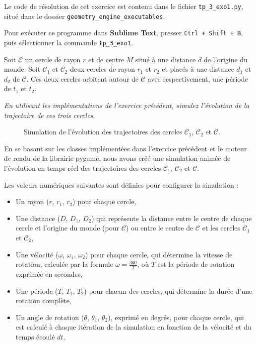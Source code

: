 \documentclass[a4paper,12pt]{article}
\begin{document}
Le code de résolution de cet exercice est contenu dans le fichier \texttt{tp\_3\_exo1.py}, situé dans le dossier \texttt{geometry\_engine\_executables}.

Pour exécuter ce programme dans \textbf{Sublime Text}, presser \texttt{Ctrl + Shift + B}, puis sélectionner la commande \texttt{tp\_3\_exo1}.

\newpage

\setlength{\parskip}{0.5em}
\setlength{\parindent}{0em}

Soit $\mathcal{C}$ un cercle de rayon $r$ et de centre $M$ situé à une distance $d$ de l'origine du monde. Soit $\mathcal{C}_1$ et $\mathcal{C}_2$ deux cercles de rayon $r_1$ et $r_2$ et placés à une distance $d_1$ et $d_2$ de $\mathcal{C}$. Ces deux cercles orbitent autour de $\mathcal{C}$ avec respectivement, une période de $t_1$ et $t_2$.

\vspace{0.5cm}

\emph{En utilisant les implémentations de l'exercice précédent, simulez l'évolution de la trajectoire de ces trois cercles.}

\begin{figure}[h]
    \centering
    \caption{Simulation de l'évolution des trajectoires des cercles $\mathcal{C}_1$, $\mathcal{C}_2$ et $\mathcal{C}$.}
    \label{fig:orbite}
\end{figure}

En se basant sur les classes implémentées dans l'exercice précédent et le moteur de rendu de la librairie pygame, 
nous avons créé une simulation animée de l'évolution en temps réel des trajectoires des cercles $\mathcal{C}_1$, $\mathcal{C}_2$ et $\mathcal{C}$.

Les valeurs numériques suivantes sont définies pour configurer la simulation :

\begin{itemize}
    \item Un rayon ($r$, $r_1$, $r_2$) pour chaque cercle,
    \item Une distance ($D$, $D_1$, $D_2$) qui représente la distance entre le centre de chaque cercle et l'origine du monde (pour $\mathcal{C}$) ou entre le centre de $\mathcal{C}$ et les cercles $\mathcal{C}_1$ et $\mathcal{C}_2$,
    \item Une vélocité ($\omega$, $\omega_1$, $\omega_2$) pour chaque cercle, qui détermine la vitesse de rotation, calculée par la formule $\omega = \frac{360}{T}$, où $T$ est la période de rotation exprimée en secondes,
    \item Une période ($T$, $T_1$, $T_2$) pour chacun des cercles, qui détermine la durée d'une rotation complète,
    \item Un angle de rotation ($\theta$, $\theta_1$, $\theta_2$), exprimé en degrés, pour chaque cercle, qui est calculé à chaque itération de la simulation en fonction de la vélocité et du temps écoulé $dt$.
\end{itemize}
\end{document}
